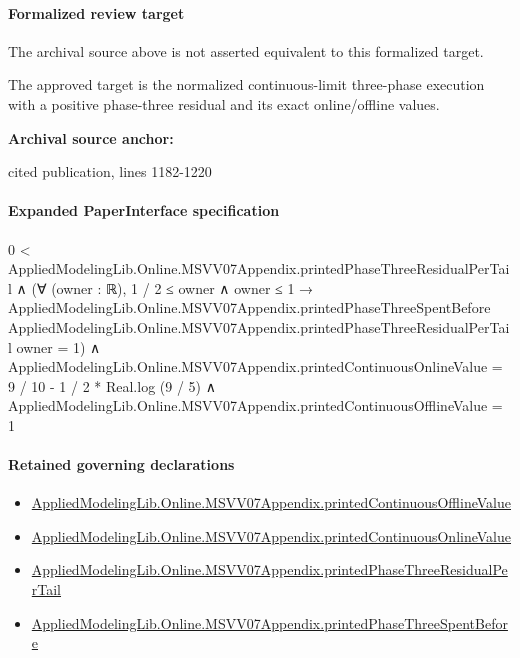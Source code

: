 \documentclass[10pt]{article}
\begin{document}
\paragraph{Formalized review target}
The archival source above is not asserted equivalent to this formalized target.
\begin{ReviewVerbatim}
The approved target is the normalized continuous-limit three-phase execution with a positive phase-three residual and its exact online/offline values.
\end{ReviewVerbatim}

\textbf{Archival source anchor:} {\footnotesize\raggedright cited publication, lines 1182-\allowbreak{}1220\par}
\paragraph{Expanded PaperInterface specification}
\begin{ReviewVerbatim}
0 < AppliedModelingLib.Online.MSVV07Appendix.printedPhaseThreeResidualPerTail ∧
  (∀ (owner : ℝ),
      1 / 2 ≤ owner ∧ owner ≤ 1 →
        AppliedModelingLib.Online.MSVV07Appendix.printedPhaseThreeSpentBefore
            AppliedModelingLib.Online.MSVV07Appendix.printedPhaseThreeResidualPerTail owner =
          1) ∧
    AppliedModelingLib.Online.MSVV07Appendix.printedContinuousOnlineValue = 9 / 10 - 1 / 2 * Real.log (9 / 5) ∧
      AppliedModelingLib.Online.MSVV07Appendix.printedContinuousOfflineValue = 1
\end{ReviewVerbatim}

\paragraph{Retained governing declarations}
\begin{itemize}\raggedright
\item \hyperlink{governing-declaration-e5424fafce38493a}{Applied\allowbreak{}Modeling\allowbreak{}Lib.\allowbreak{}Online.\allowbreak{}MSVV07\allowbreak{}Appendix.\allowbreak{}printed\allowbreak{}Continuous\allowbreak{}Offline\allowbreak{}Value}
\item \hyperlink{governing-declaration-59635b003cd74cb6}{Applied\allowbreak{}Modeling\allowbreak{}Lib.\allowbreak{}Online.\allowbreak{}MSVV07\allowbreak{}Appendix.\allowbreak{}printed\allowbreak{}Continuous\allowbreak{}Online\allowbreak{}Value}
\item \hyperlink{governing-declaration-1323d8fb70b1f391}{Applied\allowbreak{}Modeling\allowbreak{}Lib.\allowbreak{}Online.\allowbreak{}MSVV07\allowbreak{}Appendix.\allowbreak{}printed\allowbreak{}Phase\allowbreak{}Three\allowbreak{}Residual\allowbreak{}Per\allowbreak{}Tail}
\item \hyperlink{governing-declaration-099717e35e3fb48c}{Applied\allowbreak{}Modeling\allowbreak{}Lib.\allowbreak{}Online.\allowbreak{}MSVV07\allowbreak{}Appendix.\allowbreak{}printed\allowbreak{}Phase\allowbreak{}Three\allowbreak{}Spent\allowbreak{}Before}
\end{itemize}
\end{document}
